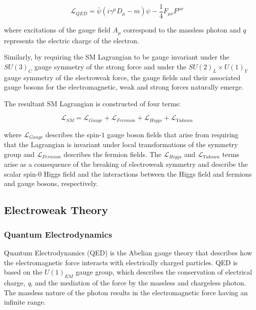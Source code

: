 \begin{equation}
\mathcal{L}_{QED} = \bar{\psi} (i {\gamma}^{\mu} D_{\mu} - m) \psi - \frac{1}{4} F_{\mu \nu} F^{\mu \nu} \;
\label{eq:qedLagrangian}
\end{equation}

where excitations of the gauge field $A_{\mu}$ correspond to the massless photon and $q$ represents the electric charge of the electron. 

Similarly, by requiring the SM Lagrangian to be gauge invariant under the $SU(3)_{C}$ gauge symmetry of the strong force and under the $SU(2)_{L} \times U(1)_{Y}$ gauge symmetry of the electroweak force, the gauge fields and their associated gauge bosons for the electromagnetic, weak and strong forces naturally emerge.

The resultant SM Lagrangian is constructed of four terms:

\begin{equation}
\mathcal{L}_{SM} = \mathcal{L}_{Gauge} + \mathcal{L}_{Fermion} + \mathcal{L}_{Higgs} + \mathcal{L}_{Yukawa} \;
\end{equation}

where $\mathcal{L}_{Gauge}$ describes the spin-$1$ gauge boson fields that arise from requiring that the Lagrangian is invariant under local transformations of the symmetry group and $\mathcal{L}_{Fermion}$ describes the fermion fields.
The $\mathcal{L}_{Higgs}$ and $\mathcal{L}_{Yukawa}$ terms arise as a consequence of the breaking of electroweak symmetry and describe the scalar spin-0 Higgs field and the interactions between the Higgs field and fermions and gauge bosons, respectively.

\subsection{Electroweak Theory}\label{subsec:QED}
\subsubsection{Quantum Electrodynamics}\label{subsec:QED}
Quantum Electrodynamics (QED) is the Abelian gauge theory that describes how the electromagnetic force interacts with electrically charged particles.
QED is based on the $U(1)_{EM}$ gauge group, which describes the conservation of electrical charge, \emph{q}, and the mediation of the force by the massless and chargeless photon.
The massless nature of the photon results in the electromagnetic force having an infinite range. 

